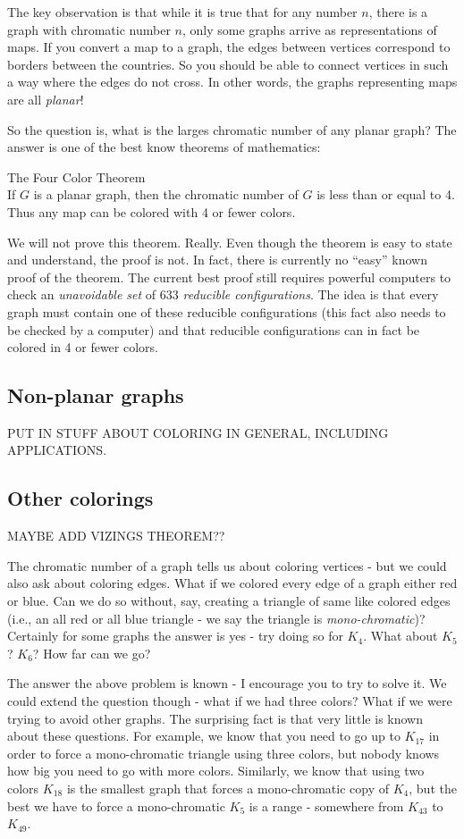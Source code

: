 \documentclass[12pt]{article}
\begin{document}
The key observation is that while it is true that for any number $n$, there is a graph with chromatic number $n$, only some graphs arrive as representations of maps.  If you convert a map to a graph, the edges between vertices correspond to borders between the countries.  So you should be able to connect vertices in such a way where the edges do not cross.  In other words, the graphs representing maps are all {\em planar}!

So the question is, what is the larges chromatic number of any planar graph?  The answer is one of the best know theorems of mathematics:

\begin{theorem}{The Four Color Theorem}\\
If $G$ is a planar graph, then the chromatic number of $G$ is less than or equal to 4.  Thus any map can be colored with 4 or fewer colors.
\end{theorem}

We will not prove this theorem.  Really.  Even though the theorem is easy to state and understand, the proof is not.  In fact, there is currently no ``easy'' known proof of the theorem.  The current best proof still requires powerful computers to check an {\em unavoidable set} of  633 {\em reducible configurations}.  The idea is that every graph must contain one of these reducible configurations (this fact also needs to be checked by a computer) and that reducible configurations can in fact be colored in 4 or fewer colors. 


\subsection*{Non-planar graphs}

PUT IN STUFF ABOUT COLORING IN GENERAL, INCLUDING APPLICATIONS.


\subsection*{Other colorings}

MAYBE ADD VIZINGS THEOREM??

The chromatic number of a graph tells us about coloring vertices - but we could also ask about coloring edges.  What if we colored every edge of a graph either red or blue.  Can we do so without, say, creating a triangle of same like colored edges (i.e., an all red or all blue triangle - we say the triangle is {\em mono-chromatic})?  Certainly for some graphs the answer is yes - try doing so for $K_4$.  What about $K_5$?  $K_6$?  How far can we go?  

The answer the above problem is known - I encourage you to try to solve it.  We could extend the question though - what if we had three colors?  What if we were trying to avoid other graphs.  The surprising fact is that very little is known about these questions.  For example, we know that you need to go up to $K_{17}$ in order to force a mono-chromatic triangle using three colors, but nobody knows how big you need to go with more colors.  Similarly, we know that using two colors $K_{18}$ is the smallest graph that forces a mono-chromatic copy of $K_4$, but the best we have to force a mono-chromatic $K_{5}$ is a range - somewhere from $K_{43}$ to $K_{49}$.
\end{document}
